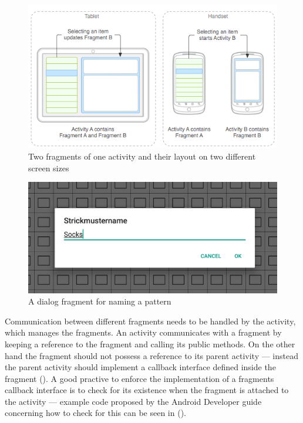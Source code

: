 \begin{figure}[h]
  \centering
    \includegraphics[width=.7\textwidth]{images/fragments.png}
   \caption[Two fragments of one activity and their layout on two different screen sizes. \protect{}]{Two fragments of one activity and their layout on two different screen sizes} 
    \label{fig:fragments_uimodules} 
\end{figure}

\begin{figure}[H]
  \centering
  \includegraphics[width=.7\textwidth]{images/pattern_name_dialog.png}
  \caption[A dialog fragment for naming a pattern \protect{}]{A dialog fragment for naming a pattern} 
  \label{fig:fragment_dialog} 
\end{figure}

Communication between different fragments needs to be handled by the activity, which manages the fragments. An activity communicates with a fragment by keeping a reference to the fragment and calling its public methods. On the other hand the fragment should not possess a reference to its parent activity --- instead the parent activity should implement a callback interface defined inside the fragment (\cite{fragment_event_callback}). A good practive to enforce the implementation of a fragments callback interface is to check for its existence when the fragment is attached to the activity --- example code proposed by the Android Developer guide concerning how to check for this can be seen in  (\cite{fragment_event_callback}).

